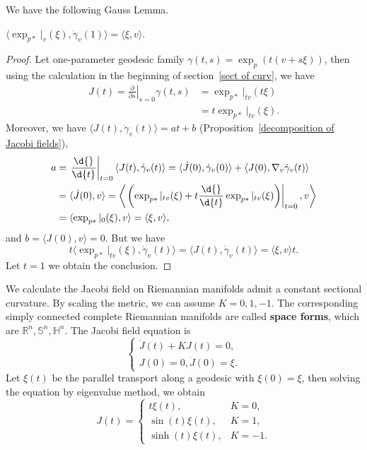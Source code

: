 We have the following Gauss Lemma.
\begin{prop}
    $\langle\exp_{p*}|_v(\xi),\dot{\gamma}_v(1)\rangle=\langle\xi,v\rangle$.
\end{prop}
\begin{proof}
    Let one-parameter geodesic family $\gamma(t,s)=\exp_p(t(v+s\xi))$, then using the calculation in the beginning of section~\ref{sect of curv}, we have
    \begin{align*}
        J(t)=\left.\frac{\partial{}}{\partial{s}}\right|_{s=0}\gamma(t,s)&=\exp_{p*}|_{tv}(t\xi)\\
        &=t\exp_{p*}|_{tv}(\xi).
    \end{align*}
    Moreover, we have $\langle J(t),\dot{\gamma}_v(t)\rangle=at+b$ (Proposition~\ref{decomposition of Jacobi fields}),
    \begin{align*}
        a&=\left.\frac{\d{}}{\d{t}}\right|_{t=0}\langle J(t),\dot{\gamma}_v(t)\rangle=\langle\dot{J}(0),\dot{\gamma}_v(0)\rangle+\langle J(0),\nabla_v\dot{\gamma}_v(t)\rangle\\
        &=\langle\dot{J}(0),v\rangle=\left\langle\left.\left(\exp_{p*}|_{tv}(\xi)+t\frac{\d{}}{\d{t}}\exp_{p*}|_{tv}(\xi)\right)\right|_{t=0},v\right\rangle\\
        &=\langle\exp_{p*}|_0(\xi),v\rangle=\langle\xi,v\rangle,
    \end{align*}
    and $b=\langle J(0),v\rangle=0$.
    But we have
    \[t\langle\exp_{p*}|_{tv}(\xi),\dot{\gamma}_v(t)\rangle=\langle J(t),\dot{\gamma}_v(t)\rangle=\langle\xi,v\rangle t.\]
    Let $t=1$ we obtain the conclusion.
\end{proof}

\begin{eg}
    We calculate the Jacobi field on Riemannian manifolds admit a constant sectional curvature.
    By scaling the metric, we can assume $K=0,1,-1$.
    The corresponding simply connected complete Riemannian manifolds are called \textbf{space forms}, which are $\mathbb{R}^n,\mathbb{S}^n,\mathbb{H}^n$.
    The Jacobi field equation is
    \[\begin{cases}
        \ddot{J}(t)+KJ(t)=0,\\
        J(0)=0,\dot{J}(0)=\xi.
    \end{cases}\]
    Let $\xi(t)$ be the parallel transport along a geodesic with $\xi(0)=\xi$, then solving the equation by eigenvalue method, we obtain
    \[J(t)=\begin{cases}
        t\xi(t), & K=0,\\
        \sin(t)\xi(t), & K=1,\\
        \sinh(t)\xi(t), & K=-1.
    \end{cases}\]
\end{eg}

